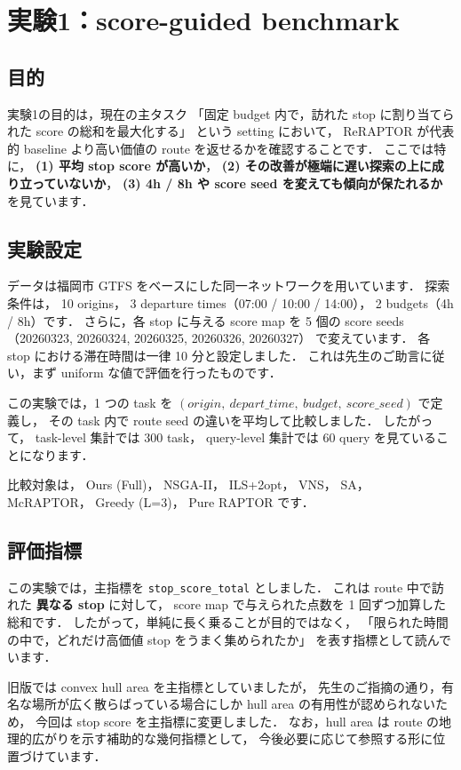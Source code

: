 \documentclass[a4paper,11pt]{article}
\newcommand{\reraptor}{ReRAPTOR}
\begin{document}
\section{実験1：score-guided benchmark}
\subsection*{目的}
実験1の目的は，現在の主タスク
「固定 budget 内で，訪れた stop に割り当てられた score の総和を最大化する」
という setting において，
\reraptor{} が代表的 baseline より高い価値の route を返せるかを確認することです．
ここでは特に，
\textbf{(1) 平均 stop score が高いか}，
\textbf{(2) その改善が極端に遅い探索の上に成り立っていないか}，
\textbf{(3) 4h / 8h や score seed を変えても傾向が保たれるか}
を見ています．

\subsection*{実験設定}
データは福岡市 GTFS をベースにした同一ネットワークを用いています．
探索条件は，
10 origins，
3 departure times（07:00 / 10:00 / 14:00），
2 budgets（4h / 8h）です．
さらに，各 stop に与える score map を 5 個の score seeds
（20260323, 20260324, 20260325, 20260326, 20260327）
で変えています．
各 stop における滞在時間は一律 10 分と設定しました．
これは先生のご助言に従い，まず uniform な値で評価を行ったものです．

この実験では，1 つの task を
\((origin,\ depart\_time,\ budget,\ score\_seed)\)
で定義し，
その task 内で route seed の違いを平均して比較しました．
したがって，
task-level 集計では 300 task，
query-level 集計では 60 query を見ていることになります．

比較対象は，
Ours (Full)，
NSGA-II，
ILS+2opt，
VNS，
SA，
McRAPTOR，
Greedy (L=3)，
Pure RAPTOR です．

\subsection*{評価指標}
この実験では，主指標を \texttt{stop\_score\_total} としました．
これは route 中で訪れた \textbf{異なる stop} に対して，
score map で与えられた点数を 1 回ずつ加算した総和です．
したがって，単純に長く乗ることが目的ではなく，
「限られた時間の中で，どれだけ高価値 stop をうまく集められたか」
を表す指標として読んでいます．

旧版では convex hull area を主指標としていましたが，
先生のご指摘の通り，有名な場所が広く散らばっている場合にしか hull area の有用性が認められないため，
今回は stop score を主指標に変更しました．
なお，hull area は route の地理的広がりを示す補助的な幾何指標として，
今後必要に応じて参照する形に位置づけています．
\end{document}
